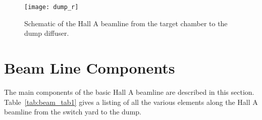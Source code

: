 \begin{figure}
\begin{center}
\texttt{[image: dump\_r]}
\caption[Beamline: Hall A Beamline Overview]{Schematic of the Hall A beamline
from the target chamber to the dump diffuser.}
\label{fig:Aline3}
\end{center}
\end{figure}

\section{Beam Line Components}
\label{sec:beam_line_comp}

The main components of the basic Hall A beamline are described
in this section.
Table~\ref{tab:beam_tab1} gives a listing of all the various elements
along the Hall A beamline from the switch yard to the dump.

